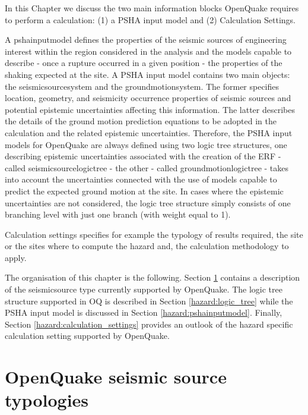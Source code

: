 %
%
In this Chapter we discuss the two main information blocks OpenQuake 
requires to perform a calculation: (1) a PSHA input model and (2) 
Calculation Settings.

A \gls{pshainputmodel} defines the properties of the seismic sources 
of engineering  interest within the region considered in the analysis and the 
models capable to describe - once a rupture occurred in a given position - the 
properties of the shaking expected at the site. 
%
A PSHA input model contains two main objects: the \gls{seismicsourcesystem} 
and the \gls{groundmotionsystem}. 
%
The former specifies location, geometry, and seismicity occurrence properties 
of seismic sources and potential epistemic uncertainties affecting this 
information. 
%
The latter describes the details of the ground motion prediction equations to 
be adopted in the calculation and the related epistemic uncertainties. 
%
Therefore, the PSHA input models for OpenQuake are always defined using two 
logic tree structures, one describing epistemic uncertainties associated 
with the creation of the ERF - called \gls{seismicsourcelogictree} - 
the other - called \gls{groundmotionlogictree} - takes into account 
the uncertainties connected with the use of models capable to predict the 
expected ground motion at the site. 
%
In cases where the epistemic uncertainties are not considered, the logic tree 
structure simply consists of one branching level with just one branch (with 
weight equal to 1).

Calculation settings specifies for example the typology of results required,
the site or the sites where to compute the hazard and, the calculation
methodology to apply.

The organisation of this chapter is the following.  
Section \ref{hazard:seismic_source_types} contains a description of the 
seismicsource type currently supported by OpenQuake. 
The logic tree structure supported in OQ is described in Section 
\ref{hazard:logic_tree} while the PSHA input model is discussed in 
Section \ref{hazard:pshainputmodel}.
Finally, Section \ref{hazard:calculation_settings} provides an outlook 
of the hazard specific calculation setting supported by OpenQuake.
%
\section[OpenQuake seismic source typologies]{OpenQuake seismic source 
typologies}
\label{hazard:seismic_source_types}

%
